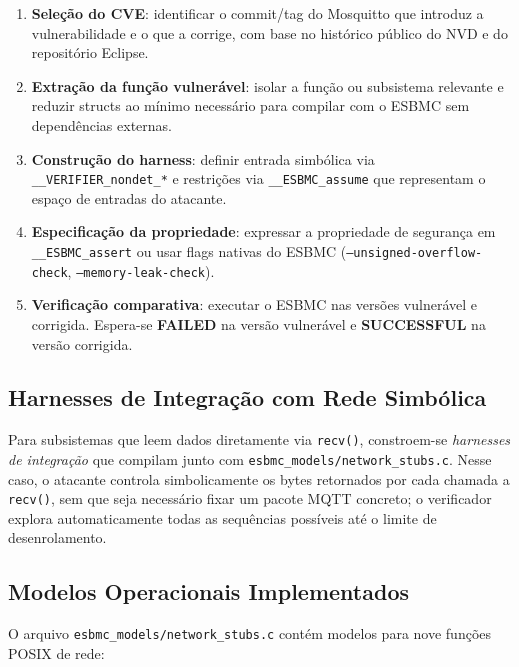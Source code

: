 \documentclass[conference]{IEEEtran}
\begin{document}
\begin{enumerate}
    \item \textbf{Sele\c{c}\~ao do CVE}: identificar o commit/tag do Mosquitto que
          introduz a vulnerabilidade e o que a corrige, com base no hist\'orico
          p\'ublico do NVD e do reposit\'orio Eclipse.

    \item \textbf{Extra\c{c}\~ao da fun\c{c}\~ao vulner\'avel}: isolar a fun\c{c}\~ao ou
          subsistema relevante e reduzir structs ao m\'inimo necess\'ario para
          compilar com o ESBMC sem depend\^encias externas.

    \item \textbf{Constru\c{c}\~ao do harness}: definir entrada simb\'olica via
          \texttt{\_\_VERIFIER\_nondet\_*} e restri\c{c}\~oes via
          \texttt{\_\_ESBMC\_assume} que representam o espa\c{c}o de entradas do
          atacante.

    \item \textbf{Especifica\c{c}\~ao da propriedade}: expressar a propriedade de
          seguran\c{c}a em \texttt{\_\_ESBMC\_assert} ou usar flags nativas do ESBMC
          (\texttt{--unsigned-overflow-check}, \texttt{--memory-leak-check}).

    \item \textbf{Verifica\c{c}\~ao comparativa}: executar o ESBMC nas vers\~oes
          vulner\'avel e corrigida. Espera-se \textbf{FAILED} na vers\~ao vulner\'avel
          e \textbf{SUCCESSFUL} na vers\~ao corrigida.
\end{enumerate}

\subsection{Harnesses de Integra\c{c}\~ao com Rede Simb\'olica}
Para subsistemas que leem dados diretamente via \texttt{recv()}, constroem-se
\emph{harnesses de integra\c{c}\~ao} que compilam junto com
\texttt{esbmc\_models/network\_stubs.c}. Nesse caso, o atacante controla
simbolicamente os bytes retornados por cada chamada a \texttt{recv()}, sem que
seja necess\'ario fixar um pacote MQTT concreto; o verificador explora
automaticamente todas as sequ\^encias poss\'iveis at\'e o limite de desenrolamento.

\subsection{Modelos Operacionais Implementados}
O arquivo \texttt{esbmc\_models/network\_stubs.c} cont\'em modelos para nove
fun\c{c}\~oes POSIX de rede:
\end{document}
